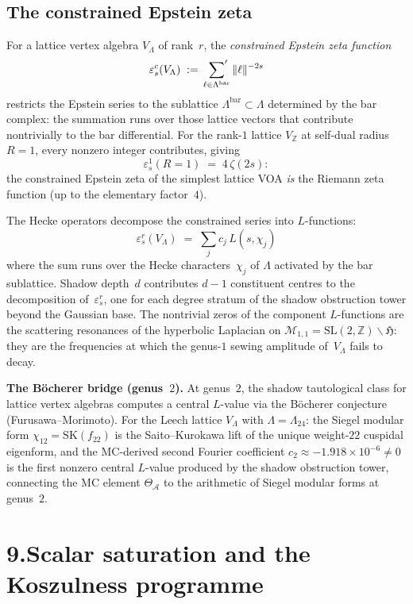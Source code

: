 \documentclass[11pt]{report}
\theoremstyle{definition}
\theoremstyle{remark}
\providecommand{\cA}{\mathcal{A}}
\providecommand{\cM}{\mathcal{M}}
\providecommand{\bZ}{\mathbb{Z}}
\numberwithin{equation}{section}
\begin{document}
\subsection*{The constrained Epstein zeta}

For a lattice vertex algebra $V_\Lambda$ of rank~$r$,
the \emph{constrained Epstein zeta function}
\[
\varepsilon^c_s(V_\Lambda)
\;:=\;
\sideset{}{'}\sum_{\ell\in\Lambda^{\mathrm{bar}}}
\|\ell\|^{-2s}
\]
restricts the Epstein series to the sublattice
$\Lambda^{\mathrm{bar}}\subset\Lambda$ determined by
the bar complex: the summation runs over those lattice
vectors that contribute nontrivially to the bar
differential. For the rank-$1$ lattice $V_{\bZ}$
at self-dual radius $R=1$, every nonzero integer
contributes, giving
\[
\varepsilon^1_s(R{=}1) \;=\; 4\,\zeta(2s):
\]
the constrained Epstein zeta of the simplest lattice
VOA \emph{is} the Riemann zeta function (up to the
elementary factor~$4$).

The Hecke operators decompose the constrained series into
$L$-functions:
\[
\varepsilon^r_s(V_\Lambda)
\;=\;
\sum_j c_j\,L(s,\chi_j)
\]
where the sum runs over the Hecke characters~$\chi_j$ of
$\Lambda$ activated by the bar sublattice. Shadow
depth~$d$ contributes $d-1$ constituent centres to the
decomposition of~$\varepsilon^r_s$, one for
each degree stratum of the shadow obstruction tower beyond the
Gaussian base. The nontrivial zeros of the
component $L$-functions are the scattering resonances of
the hyperbolic Laplacian on $\cM_{1,1}=\mathrm{SL}(2,\bZ)\backslash\mathfrak H$:
they are the frequencies at which the genus-$1$ sewing
amplitude of~$V_\Lambda$ fails to decay.

\medskip
\noindent\textbf{The B\"ocherer bridge (genus~$2$).}\enspace
At genus~$2$, the shadow tautological class for lattice vertex
algebras computes a central $L$-value via the B\"ocherer conjecture
(Furusawa--Morimoto). For the Leech lattice $V_\Lambda$ with
$\Lambda = \Lambda_{24}$: the Siegel modular form
$\chi_{12} = \mathrm{SK}(f_{22})$ is the Saito--Kurokawa lift of the
unique weight-$22$ cuspidal eigenform, and the MC-derived second
Fourier coefficient $c_2 \approx -1.918 \times 10^{-6} \neq 0$ is
the first nonzero central $L$-value produced by the shadow obstruction tower,
connecting the MC element $\Theta_\cA$ to the arithmetic of
Siegel modular forms at genus~$2$.

\section*{9.\quad Scalar saturation and the Koszulness programme}
\end{document}
